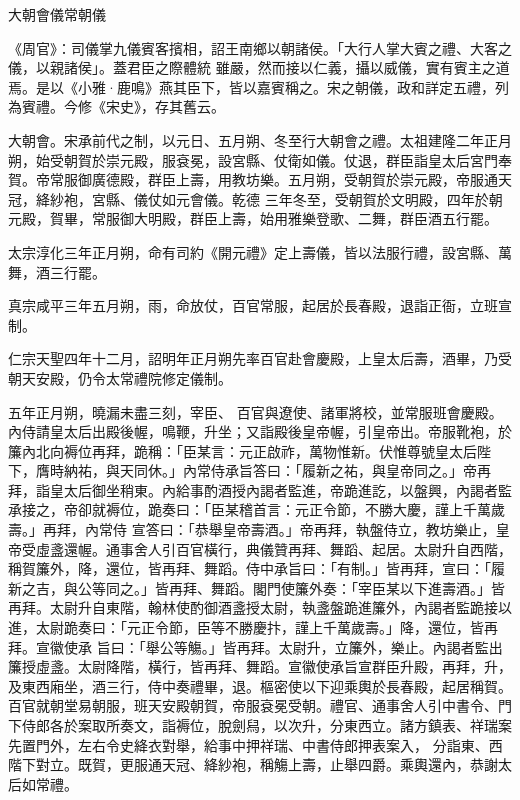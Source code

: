 
\begin{pinyinscope}

 大朝會儀常朝儀



 《周官》：司儀掌九儀賓客擯相，詔王南鄉以朝諸侯。「大行人掌大賓之禮、大客之儀，以親諸侯」。蓋君臣之際體統
 雖嚴，然而接以仁義，攝以威儀，實有賓主之道焉。是以《小雅·鹿鳴》燕其臣下，皆以嘉賓稱之。宋之朝儀，政和詳定五禮，列為賓禮。今修《宋史》，存其舊云。



 大朝會。宋承前代之制，以元日、五月朔、冬至行大朝會之禮。太祖建隆二年正月朔，始受朝賀於崇元殿，服袞冕，設宮縣、仗衛如儀。仗退，群臣詣皇太后宮門奉賀。帝常服御廣德殿，群臣上壽，用教坊樂。五月朔，受朝賀於崇元殿，帝服通天冠，絳紗袍，宮縣、儀仗如元會儀。乾德
 三年冬至，受朝賀於文明殿，四年於朝元殿，賀畢，常服御大明殿，群臣上壽，始用雅樂登歌、二舞，群臣酒五行罷。



 太宗淳化三年正月朔，命有司約《開元禮》定上壽儀，皆以法服行禮，設宮縣、萬舞，酒三行罷。



 真宗咸平三年五月朔，雨，命放仗，百官常服，起居於長春殿，退詣正衙，立班宣制。



 仁宗天聖四年十二月，詔明年正月朔先率百官赴會慶殿，上皇太后壽，酒畢，乃受朝天安殿，仍令太常禮院修定儀制。



 五年正月朔，曉漏未盡三刻，宰臣、
 百官與遼使、諸軍將校，並常服班會慶殿。內侍請皇太后出殿後幄，鳴鞭，升坐；又詣殿後皇帝幄，引皇帝出。帝服靴袍，於簾內北向褥位再拜，跪稱：「臣某言：元正啟祚，萬物惟新。伏惟尊號皇太后陛下，膺時納祐，與天同休。」內常侍承旨答曰：「履新之祐，與皇帝同之。」帝再拜，詣皇太后御坐稍東。內給事酌酒授內謁者監進，帝跪進訖，以盤興，內謁者監承接之，帝卻就褥位，跪奏曰：「臣某稽首言：元正令節，不勝大慶，謹上千萬歲壽。」再拜，內常侍
 宣答曰：「恭舉皇帝壽酒。」帝再拜，執盤侍立，教坊樂止，皇帝受虛盞還幄。通事舍人引百官橫行，典儀贊再拜、舞蹈、起居。太尉升自西階，稱賀簾外，降，還位，皆再拜、舞蹈。侍中承旨曰：「有制。」皆再拜，宣曰：「履新之吉，與公等同之。」皆再拜、舞蹈。閣門使簾外奏：「宰臣某以下進壽酒。」皆再拜。太尉升自東階，翰林使酌御酒盞授太尉，執盞盤跪進簾外，內謁者監跪接以進，太尉跪奏曰：「元正令節，臣等不勝慶抃，謹上千萬歲壽。」降，還位，皆再拜。宣徽使承
 旨曰：「舉公等觴。」皆再拜。太尉升，立簾外，樂止。內謁者監出簾授虛盞。太尉降階，橫行，皆再拜、舞蹈。宣徽使承旨宣群臣升殿，再拜，升，及東西廂坐，酒三行，侍中奏禮畢，退。樞密使以下迎乘輿於長春殿，起居稱賀。百官就朝堂易朝服，班天安殿朝賀，帝服袞冕受朝。禮官、通事舍人引中書令、門下侍郎各於案取所奏文，詣褥位，脫劍舄，以次升，分東西立。諸方鎮表、祥瑞案先置門外，左右令史絳衣對舉，給事中押祥瑞、中書侍郎押表案入，
 分詣東、西階下對立。既賀，更服通天冠、絳紗袍，稱觴上壽，止舉四爵。乘輿還內，恭謝太后如常禮。




\end{pinyinscope}
